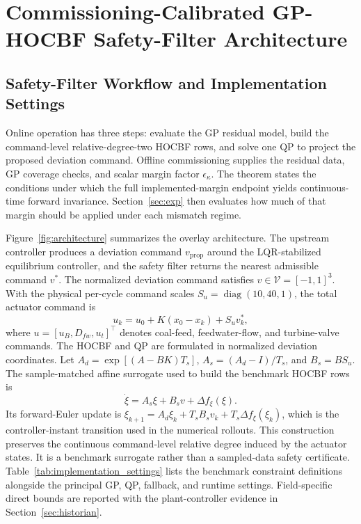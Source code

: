 \section{Commissioning-Calibrated GP-HOCBF Safety-Filter Architecture}
\label{sec:method}

\subsection{Safety-Filter Workflow and Implementation Settings}

Online operation has three steps: evaluate the GP residual model, build the command-level relative-degree-two HOCBF rows, and solve one QP to project the proposed deviation command. Offline commissioning supplies the residual data, GP coverage checks, and scalar margin factor $\epsilon_\kappa$. The theorem states the conditions under which the full implemented-margin endpoint yields continuous-time forward invariance. Section~\ref{sec:exp} then evaluates how much of that margin should be applied under each mismatch regime.

Figure~\ref{fig:architecture} summarizes the overlay architecture. The upstream controller produces a deviation command $v_{\mathrm{prop}}$ around the LQR-stabilized equilibrium controller, and the safety filter returns the nearest admissible command $v^*$. The normalized deviation command satisfies $v\in\mathcal{V}=[-1,1]^3$. With the physical per-cycle command scales $S_u=\operatorname{diag}(10,40,1)$, the total actuator command is
\begin{equation}
    u_k = u_0 + K(x_0-x_k) + S_u v_k^* ,
    \label{eq:deviation_control}
\end{equation}
where $u=[u_B,D_{fw},u_t]^\top$ denotes coal-feed, feedwater-flow, and turbine-valve commands. The HOCBF and QP are formulated in normalized deviation coordinates. Let $A_d=\exp[(A-BK)T_s]$, $A_s=(A_d-I)/T_s$, and $B_s=BS_u$. The sample-matched affine surrogate used to build the benchmark HOCBF rows is
\begin{equation}
    \dot{\xi}=A_s\xi+B_sv+\Delta f_\xi(\xi).
    \label{eq:stabilized_deviation_model}
\end{equation}
Its forward-Euler update is $\xi_{k+1}=A_d\xi_k+T_sB_sv_k+T_s\Delta f_\xi(\xi_k)$, which is the controller-instant transition used in the numerical rollouts. This construction preserves the continuous command-level relative degree induced by the actuator states. It is a benchmark surrogate rather than a sampled-data safety certificate.
Table~\ref{tab:implementation_settings} lists the benchmark constraint definitions alongside the principal GP, QP, fallback, and runtime settings. Field-specific direct bounds are reported with the plant-controller evidence in Section~\ref{sec:historian}.

